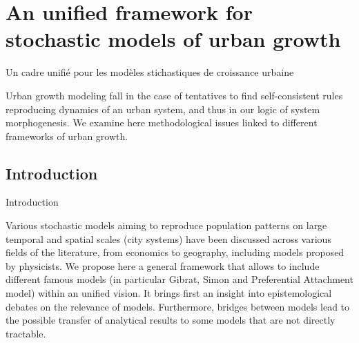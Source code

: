 






\newpage

\section{An unified framework for stochastic models of urban growth}{Un cadre unifié pour les modèles stichastiques de croissance urbaine}

Urban growth modeling fall in the case of tentatives to find self-consistent rules reproducing dynamics of an urban system, and thus in our logic of system morphogenesis.  We examine here methodological issues linked to different frameworks of urban growth.

\subsection{Introduction}{Introduction}

Various stochastic models aiming to reproduce population patterns on large temporal and spatial scales (city systems) have been discussed across various fields of the literature, from economics to geography, including models proposed by physicists. We propose here a general framework that allows to include different famous models (in particular Gibrat, Simon and Preferential Attachment model) within an unified vision. It brings first an insight into epistemological debates on the relevance of models. Furthermore, bridges between models lead to the possible transfer of analytical results to some models that are not directly tractable.


